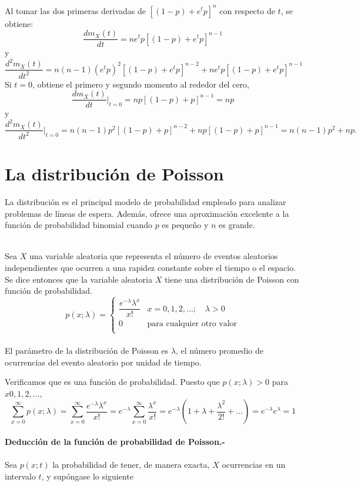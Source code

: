 Al tomar las dos primeras derivadas de $[(1-p)+e^tp]^n$ con respecto de $t$, se obtiene:
$$\dfrac{dm_X(t)}{dt} = ne^t p [(1-p)+e^t p]^{n-1}$$
y
$$\dfrac{d^2m_X (t)}{dt^2}=n(n-1)(e^t p)^2[(1-p)+e^tp]^{n-2}+ne^t p[(1-p)+e^t p]^{n-1}$$
Si $t=0$, obtiene el primero y segundo momento al rededor del cero,
$$\dfrac{dm_X(t)}{dt}\bigg|_{t=0} = np[(1-p)+p]^{n-1} = np$$
y
$$\dfrac{d^2m_X(t)}{dt^2}\bigg|_{t=0} = n(n-1)p^2[(1-p)+p]^{n-2} + np[(1-p)+p]^{n-1}=n(n-1)p^2 + np.$$

\section{La distribución de Poisson}
La distribución es el principal modelo de probabilidad empleado para analizar problemas de líneas de espera. Además, ofrece una aproximación excelente a la función de probabilidad binomial cuando $p$ es pequeño y $n$ es grande.\\\\

\begin{tcolorbox}[colback=white]
    \begin{def.}
	Sea $X$ una variable aleatoria que representa el número de eventos aleatorios independientes que ocurren a una rapidez constante sobre el tiempo o el espacio. Se dice entonces que la variable aleatoria $X$ tiene una distribución de Poisson con función de probabilidad.
	$$p(x;\lambda)=\left\{\begin{array}{ll}
		\dfrac{e^{-\lambda}\lambda^x}{x!} & x=0,1,2,\ldots; \quad \lambda > 0\\
		0&\mbox{para cualquier otro valor}\\
	\end{array}\right.$$\\
	El parámetro de la distribución de Poisson es $\lambda$, el número promedio de ocurrencias del evento aleatorio por unidad de tiempo.
    \end{def.}
\end{tcolorbox}
Verificamos que es una función de probabilidad. Puesto que $p(x;\lambda)>0$ para $x0,1,2,\ldots$,
$$\sum_{x=0}^\infty p(x;\lambda) = \sum_{x=0}^\infty \dfrac{e^{-\lambda}\lambda^x}{x!} = e^{-\lambda}\sum_{x=0}^\infty \dfrac{\lambda^x}{x!}=e^{-\lambda}\left(1+\lambda + \dfrac{\lambda^2}{2!}+\ldots\right) = e^{-\lambda}e^{\lambda}=1$$\\

\textbf{Deducción de la función de probabilidad de Poisson.-}\\\\

Sea $p(x;t)$ la probabilidad de tener, de manera exacta, $X$ ocurrencias en un intervalo $t$, y supóngase lo siguiente 

